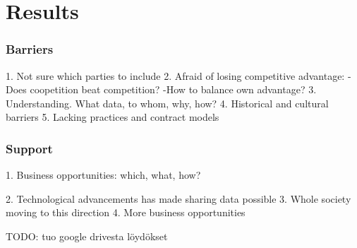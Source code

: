 \chapter{Results}
\label{chapter:results}




\subsection{Barriers}
1. Not sure which parties to include
2. Afraid of losing competitive advantage:
	-Does coopetition beat competition?
	-How to balance own advantage?
3. Understanding. What data, to whom, why, how?
4. Historical and cultural barriers
5. Lacking practices and contract models


\subsection{Support}

1. Business opportunities:
which, what, how?


2. Technological advancements has made sharing data possible
3. Whole society moving to this direction
4. More business opportunities






TODO: tuo google drivesta löydökset
